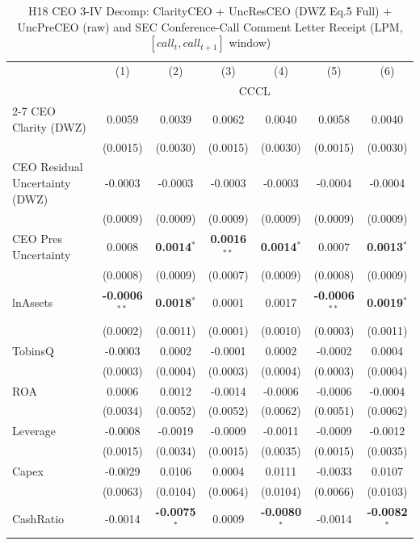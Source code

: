 \begin{landscape}
\begin{table}[H]
\setlength{\tabcolsep}{3pt}
\renewcommand{\arraystretch}{0.85}
\centering
\caption{H18 CEO 3-IV Decomp: ClarityCEO + UncResCEO (DWZ Eq.5 Full) + UncPreCEO (raw) and SEC Conference-Call Comment Letter Receipt (LPM, $[\textit{call}_t, \textit{call}_{t+1}]$ window)}
\label{tab:h18_ceo2_decomp}
\scriptsize
\begin{tabular}{lcccccc}
\toprule
 & (1) & (2) & (3) & (4) & (5) & (6) \\
 & \multicolumn{6}{c}{CCCL} \\
\cmidrule(lr){2-7}
\midrule
CEO Clarity (DWZ) & 0.0059 & 0.0039 & 0.0062 & 0.0040 & 0.0058 & 0.0040 \\
 & (0.0015) & (0.0030) & (0.0015) & (0.0030) & (0.0015) & (0.0030) \\
CEO Residual Uncertainty (DWZ) & -0.0003 & -0.0003 & -0.0003 & -0.0003 & -0.0004 & -0.0004 \\
 & (0.0009) & (0.0009) & (0.0009) & (0.0009) & (0.0009) & (0.0009) \\
CEO Pres Uncertainty & 0.0008 & \textbf{0.0014}$^{*}$ & \textbf{0.0016}$^{**}$ & \textbf{0.0014}$^{*}$ & 0.0007 & \textbf{0.0013}$^{*}$ \\
 & (0.0008) & (0.0009) & (0.0007) & (0.0009) & (0.0008) & (0.0009) \\
\midrule
lnAssets & \textbf{-0.0006}$^{**}$ & \textbf{0.0018}$^{*}$ & 0.0001 & 0.0017 & \textbf{-0.0006}$^{**}$ & \textbf{0.0019}$^{*}$ \\
 & (0.0002) & (0.0011) & (0.0001) & (0.0010) & (0.0003) & (0.0011) \\
TobinsQ & -0.0003 & 0.0002 & -0.0001 & 0.0002 & -0.0002 & 0.0004 \\
 & (0.0003) & (0.0004) & (0.0003) & (0.0004) & (0.0003) & (0.0004) \\
ROA & 0.0006 & 0.0012 & -0.0014 & -0.0006 & -0.0006 & -0.0004 \\
 & (0.0034) & (0.0052) & (0.0052) & (0.0062) & (0.0051) & (0.0062) \\
Leverage & -0.0008 & -0.0019 & -0.0009 & -0.0011 & -0.0009 & -0.0012 \\
 & (0.0015) & (0.0034) & (0.0015) & (0.0035) & (0.0015) & (0.0035) \\
Capex & -0.0029 & 0.0106 & 0.0004 & 0.0111 & -0.0033 & 0.0107 \\
 & (0.0063) & (0.0104) & (0.0064) & (0.0104) & (0.0066) & (0.0103) \\
CashRatio & -0.0014 & \textbf{-0.0075}$^{*}$ & 0.0009 & \textbf{-0.0080}$^{*}$ & -0.0014 & \textbf{-0.0082}$^{*}$ \\

\end{tabular}
\end{table}
\end{landscape}

